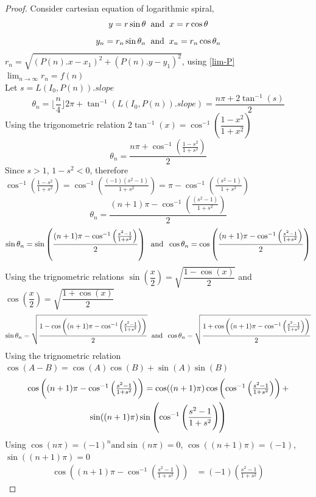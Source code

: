 \documentclass[preprint,12pt]{elsarticle}
\begin{document}
	\begin{proof}
		Consider cartesian equation of logarithmic spiral, $$y = r\sin{\theta} \hspace{2mm}\text{and}\hspace{2mm}x = r\cos{\theta}$$
		$$y_n = r_n\sin{\theta_n} \hspace{2mm}\text{and}\hspace{2mm}x_n = r_n\cos{\theta_n}$$
		$r_n = \sqrt{(P(n).x - x_1)^2 + (P(n).y - y_1)^2}$, using \ref{lim-P} $\lim_{n \to \infty} r_n = f(n)$\\
		Let $s = L(I_0, P(n)).slope$
		$$\theta_n = \lfloor\dfrac{n}{4}\rfloor 2\pi + \tan^{-1}(L(I_0, P(n)).slope) = \dfrac{n\pi + 2\tan^{-1}(s)}{2}$$
		Using the trigonometric relation $2\tan^{-1}(x) = \cos^{-1}\left(\dfrac{1-x^2}{1+x^2}\right)$
		$$\theta_n = \dfrac{n\pi + \cos^{-1}\left(\frac{1-s^2}{1+s^2}\right)}{2}$$
		Since $s > 1$, $1 - s^2 < 0$, therefore $\cos^{-1}\left(\frac{1-s^2}{1+s^2}\right) = \cos^{-1}\left(\frac{(-1)(s^2-1)}{1+s^2}\right) = \pi - \cos^{-1}\left(\frac{(s^2-1)}{1+s^2}\right)$
		$$\theta_n = \dfrac{(n+1)\pi - \cos^{-1}\left(\frac{(s^2-1)}{1+s^2}\right)}{2}$$
		$$\sin\theta_n = \sin\left(\dfrac{(n+1)\pi - \cos^{-1}\left(\frac{s^2-1}{1+s^2}\right)}{2}\right)\hspace{2mm}\text{and}\hspace{2mm}\cos\theta_n = \cos\left(\dfrac{(n+1)\pi - \cos^{-1}\left(\frac{s^2-1}{1+s^2}\right)}{2}\right)$$
		Using the trignometric relations $\sin\left(\dfrac{x}{2}\right) = \sqrt{\dfrac{1 - \cos(x)}{2}}$ and $\cos\left(\dfrac{x}{2}\right) = \sqrt{\dfrac{1 + \cos(x)}{2}}$
		$$\sin\theta_n = \sqrt{\dfrac{1 - \cos\left((n+1)\pi - \cos^{-1}\left(\frac{s^2-1}{1+s^2}\right)\right)}{2}}\hspace{2mm}\text{and}\hspace{2mm}\cos\theta_n = \sqrt{\dfrac{1 + \cos\left((n+1)\pi - \cos^{-1}\left(\frac{s^2-1}{1+s^2}\right)\right)}{2}}$$
		Using the trignometric relation $\cos(A-B) = \cos(A)\cos(B)+\sin(A)\sin(B)$
		\begin{multline*}
		$$\cos\left((n+1)\pi - \cos^{-1}\left(\frac{s^2-1}{1+s^2}\right)\right)=\cos((n+1)\pi)\cos\left(\cos^{-1}\left(\frac{s^2-1}{1+s^2}\right)\right)+\\ \sin((n+1)\pi)\sin\left(\cos^{-1}\left(\frac{s^2-1}{1+s^2}\right)\right)$$
		\end{multline*}
		Using $\cos(n\pi) = (-1)^n\text{and}\sin(n\pi) = 0$, $\cos((n+1)\pi) = (-1)$, $\sin((n+1)\pi) = 0$
		\begin{align*}
		\cos\left((n+1)\pi - \cos^{-1}\left(\frac{s^2-1}{1+s^2}\right)\right) &= (-1)\left(\frac{s^2-1}{1+s^2}\right)

\end{align*}
\end{proof}
\end{document}
